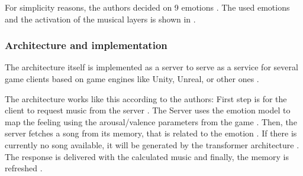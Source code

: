 For simplicity reasons, the authors decided on 9 
emotions \cite{amaral2022adaptive}. 
The used emotions and the activation of the musical
layers is shown in .

\subsubsection{Architecture and implementation}
The architecture itself is implemented as a server
to serve as a service for several game clients based on game engines like Unity, Unreal, or other ones \cite{amaral2022adaptive}.

The architecture works like this according to the authors: First step is for the client to request 
music from the server \cite{amaral2022adaptive}. The Server uses the emotion model
to map the feeling using the arousal/valence parameters
from the game \cite{amaral2022adaptive}. Then, the server fetches a song from
its memory, that is related to the emotion \cite{amaral2022adaptive}. If there is
currently no song available, it will be generated by 
the transformer architecture \cite{amaral2022adaptive}. The response is delivered
with the calculated music and finally, the memory is refreshed \cite{amaral2022adaptive}.







